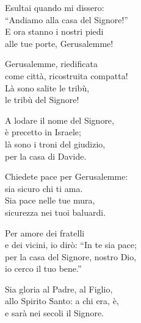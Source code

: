 

\spazio

\strofa Esultai quando mi dissero:\\
``Andiamo alla casa del Signore!''\\
E ora stanno i nostri piedi \\
alle tue porte, Gerusalemme!

\spazio

\strofa Gerusalemme, riedificata\\
come città, ricostruita compatta!\\
Là sono salite le tribù,\\
le tribù del Signore!

\spazio

\strofa A lodare il nome del Signore,\\
è precetto in Israele;\\
là sono i troni del giudizio,\\
per la casa di Davide.

\spazio

\strofa Chiedete pace per Gerusalemme:\\
sia sicuro chi ti ama.\\
Sia pace nelle tue mura,\\
sicurezza nei tuoi baluardi.

\spazio

\strofa Per amore dei fratelli\\
e dei vicini, io dirò: ``In te sia pace;\\
per la casa del Signore, nostro Dio,\\
io cerco il tuo bene.''

\spazio

\strofa Sia gloria al Padre, al Figlio,\\
allo Spirito Santo: a chi era, è,\\
e sarà nei secoli il Signore.